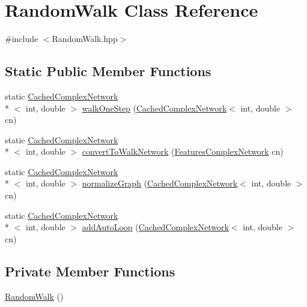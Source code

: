 \hypertarget{class_random_walk}{\section{Random\+Walk Class Reference}
\label{class_random_walk}
}


{\ttfamily \#include $<$Random\+Walk.\+hpp$>$}

\subsection*{Static Public Member Functions}
\begin{DoxyCompactItemize}
\item 
static \hyperlink{class_cached_complex_network}{Cached\+Complex\+Network}\\*
$<$ int, double $>$ \hyperlink{class_random_walk_a73523fd28b8a0ded02df274b48612b34}{walk\+One\+Step} (\hyperlink{class_cached_complex_network}{Cached\+Complex\+Network}$<$ int, double $>$ cn)
\item 
static \hyperlink{class_cached_complex_network}{Cached\+Complex\+Network}\\*
$<$ int, double $>$ \hyperlink{class_random_walk_a1977261ae7d29ca259c8f32109865ece}{convert\+To\+Walk\+Network} (\hyperlink{class_features_complex_network}{Features\+Complex\+Network} cn)
\item 
static \hyperlink{class_cached_complex_network}{Cached\+Complex\+Network}\\*
$<$ int, double $>$ \hyperlink{class_random_walk_a109a954297bccef967459d6dc1e9d98a}{normalize\+Graph} (\hyperlink{class_cached_complex_network}{Cached\+Complex\+Network}$<$ int, double $>$ cn)
\item 
static \hyperlink{class_cached_complex_network}{Cached\+Complex\+Network}\\*
$<$ int, double $>$ \hyperlink{class_random_walk_a135ac9a96a3d7d21f9c3e75298974752}{add\+Auto\+Loop} (\hyperlink{class_cached_complex_network}{Cached\+Complex\+Network}$<$ int, double $>$ cn)
\end{DoxyCompactItemize}
\subsection*{Private Member Functions}
\begin{DoxyCompactItemize}
\item 
\hyperlink{class_random_walk_a5ce75810b5bf17927f1e4aa48a4f1fd8}{Random\+Walk} ()
\end{DoxyCompactItemize}



